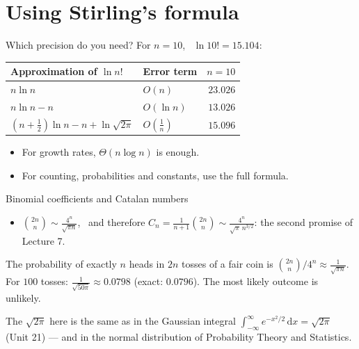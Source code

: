\documentclass[10pt]{wosm-slides}
\newcommand{\dx}{\,\mathrm{d}x}
\begin{document}
\section{Using Stirling's formula}

\begin{frame}{Which precision do you need?}
  For $n = 10$, \ $\ln 10! = 15.104$:
  \begin{center}
  \small\renewcommand{\arraystretch}{1.25}
  \begin{tabular}{@{}llr@{}}
    \toprule
    \textbf{Approximation of $\ln n!$} & \textbf{Error term} & $n = 10$ \\
    \midrule
    $n \ln n$                                 & $O(n)$       & $23.026$ \\
    $n \ln n - n$                             & $O(\ln n)$   & $13.026$ \\
    $(n + \frac12)\ln n - n + \ln\sqrt{2\pi}$ & $O(\frac1n)$ & $15.096$ \\
    \bottomrule
  \end{tabular}
  \end{center}
  \begin{itemize}
    \item For growth rates, $\Theta(n \log n)$ is enough.
    \item For counting, probabilities and constants, use the full formula.
  \end{itemize}
\end{frame}

\begin{frame}{Binomial coefficients and Catalan numbers}
  \begin{itemize}
    \item $\displaystyle\binom{2n}{n} \sim \frac{4^n}{\sqrt{\pi n}}$, \ and therefore
      $\displaystyle C_n = \frac{1}{n+1}\binom{2n}{n} \sim \frac{4^n}{\sqrt\pi\, n^{3/2}}$:
      the second promise of Lecture 7.
  \end{itemize}
  \pause
  \begin{example}
    The probability of exactly $n$ heads in $2n$ tosses of a fair coin is
    $\binom{2n}{n} / 4^n \approx \frac{1}{\sqrt{\pi n}}$. For $100$ tosses:
    $\frac{1}{\sqrt{50\pi}} \approx 0.0798$ (exact: $0.0796$). The most likely outcome is unlikely.
  \end{example}
  {\small The $\sqrt{2\pi}$ here is the same as in the Gaussian integral
  $\int_{-\infty}^\infty e^{-x^2/2}\dx = \sqrt{2\pi}$ (Unit 21) --- and in the normal distribution
  of Probability Theory and Statistics.\par}
\end{frame}
\end{document}
